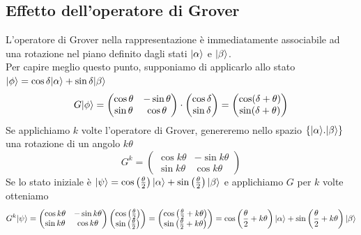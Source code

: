 \documentclass[12pt, a4paper]{report}
\begin{document}
\subsection{Effetto dell'operatore di Grover}
L'operatore di Grover nella rappresentazione è immediatamente associabile ad una rotazione nel piano definito dagli stati $| \alpha \rangle$ e $| \beta \rangle$.\\
Per capire meglio questo punto, supponiamo di applicarlo allo stato $| \phi \rangle=\cos\delta| \alpha \rangle+\sin\delta| \beta \rangle$
\begin{equation*}
    G| \phi \rangle = \begin{pmatrix}
        \cos\theta & -\sin\theta \\
        \sin\theta & \cos\theta
    \end{pmatrix}\cdot \begin{pmatrix}
        \cos\delta \\
        \sin\delta
    \end{pmatrix} = \begin{pmatrix}
        \cos(\delta+\theta) \\
        \sin(\delta+\theta)
    \end{pmatrix}
\end{equation*}
Se applichiamo $k$ volte l'operatore di Grover, genereremo nello spazio $\{| \alpha \rangle.| \beta \rangle\}$ una rotazione di un angolo $k\theta$
\begin{equation*}
    G^{k} = \begin{pmatrix}
        \cos k\theta & -\sin k\theta \\
        \sin k\theta & \cos k\theta
    \end{pmatrix}
\end{equation*}
Se lo stato iniziale è $| \psi \rangle= \cos\left(\frac{\theta}{2}\right)| \alpha \rangle+\sin\left(\frac{\theta}{2}\right)| \beta \rangle$ e applichiamo $G$ per $k$ volte otteniamo
\footnotesize
\begin{equation*}
    G^{k}| \psi \rangle = \begin{pmatrix}
        \cos k\theta & -\sin k\theta \\
        \sin k\theta & \cos k\theta
    \end{pmatrix}\begin{pmatrix}
        \cos\left(\frac{\theta}{2}\right) \\
        \sin\left(\frac{\theta}{2}\right)
    \end{pmatrix} =
    \begin{pmatrix}
        \cos\left(\frac{\theta}{2}+k\theta\right) \\
        \sin\left(\frac{\theta}{2}+k\theta\right)
    \end{pmatrix} =
    \cos\left(\frac{\theta}{2}+k\theta\right)| \alpha \rangle+\sin\left(\frac{\theta}{2}+k\theta\right)| \beta \rangle
\end{equation*}
\normalsize
\end{document}
